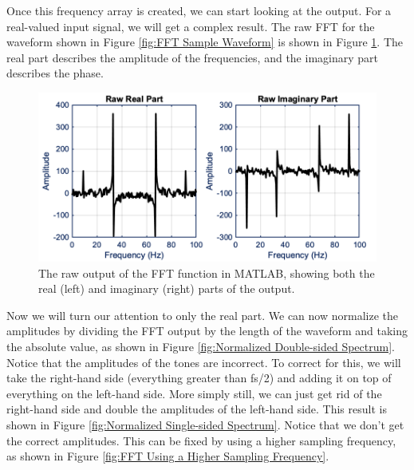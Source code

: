 Once this frequency array is created, we can start looking at the output.
For a real-valued input signal, we will get a complex result.
The raw FFT for the waveform shown in Figure \ref{fig:FFT Sample Waveform} is shown in Figure \ref{fig:Raw FFT Output}.
The real part describes the amplitude of the frequencies, and the imaginary part describes the phase.

\begin{figure}[H]
    \centering
    \includegraphics[width = 6 in]{Chapters/Signal Processing/Figures/Raw FFT Output.png}
    \caption{The raw output of the FFT function in MATLAB, showing both the real (left) and imaginary (right) parts of the output.}
    \label{fig:Raw FFT Output}
\end{figure}

Now we will turn our attention to only the real part.
We can now normalize the amplitudes by dividing the FFT output by the length of the waveform and taking the absolute value, as shown in Figure \ref{fig:Normalized Double-sided Spectrum}.
Notice that the amplitudes of the tones are incorrect.
To correct for this, we will take the right-hand side (everything greater than fs/2) and adding it on top of everything on the left-hand side.
More simply still, we can just get rid of the right-hand side and double the amplitudes of the left-hand side.
This result is shown in Figure \ref{fig:Normalized Single-sided Spectrum}.
Notice that we don't get the correct amplitudes. This can be fixed by using a higher sampling frequency, as shown in Figure \ref{fig:FFT Using a Higher Sampling Frequency}.

